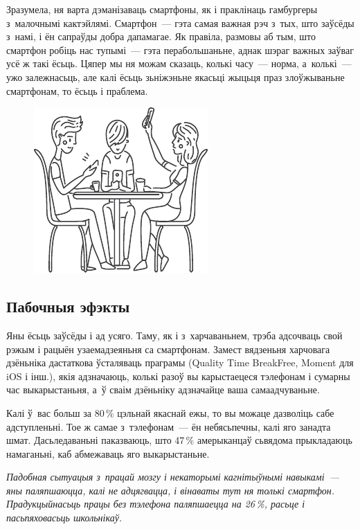 Зразумела, ня варта дэманізаваць смартфоны, як і праклінаць гамбургеры з~малочнымі кактэйлямі. Смартфон~--- гэта самая важная рэч з~тых, што заўсёды з~намі, і ён сапраўды добра дапамагае. Як правіла, размовы аб тым, што смартфон робіць нас тупымі~--- гэта перабольшаньне, аднак шэраг важных заўваг усё ж такі ёсьць. Цяпер мы ня можам сказаць, колькі часу~--- норма, а~колькі~--- ужо залежнасьць, але калі ёсьць зьніжэньне якасьці жыцьця праз злоўжываньне смартфонам, то ёсьць і праблема.

\begin{figure}[htb!]
  \centering
  \includegraphics[scale=1.5]{willpower/ch13/1.pdf}
\end{figure}

\subsection*{Пабочныя эфэкты}

Яны ёсьць заўсёды і ад усяго. Таму, як і з~харчаваньнем, трэба адсочваць свой рэжым і рацыён узаемадзеяньня са смартфонам. Замест вядзеньня харчовага дзёньніка дастаткова ўсталяваць праграмы (Quality Time BreakFree, Moment для iOS і інш.), якія адзначаюць, колькі разоў вы карыстаецеся тэлефонам і сумарны час выкарыстаньня, а~ў сваім дзёньніку адзначайце ваша самаадчуваньне.


Калі ў~вас больш за 80\,\% цэльнай якаснай ежы, то вы можаце дазволіць сабе адступленьні. Тое ж самае з~тэлефонам~--- ён небясьпечны, калі яго занадта шмат. Дасьледаваньні паказваюць, што 47\,\% амерыканцаў сьвядома прыкладаюць намаганьні, каб абмежаваць яго выкарыстаньне.

\emph{Падобная сытуацыя з~працай мозгу і некаторымі кагнітыўнымі навыкамі~--- яны паляпшаюцца, калі не адцягвацца, і вінаваты тут ня толькі смартфон. Прадукцыйнасьць працы без тэлефона паляпшаецца на 26\,\%, расьце і пасьпяховасьць школьнікаў.}

